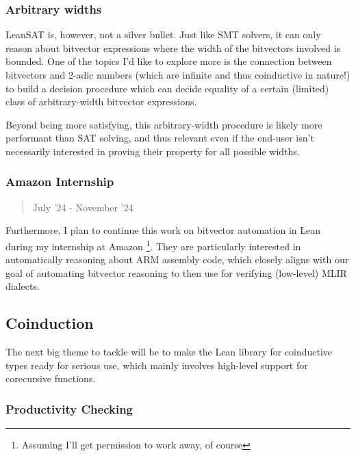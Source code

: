 \hypertarget{arbitrary-widths}{%
\subsubsection{Arbitrary widths}\label{arbitrary-widths}}

LeanSAT is, however, not a silver bullet. Just like SMT solvers, it can
only reason about bitvector expressions where the width of the
bitvectors involved is bounded. One of the topics I'd like to explore
more is the connection between bitvectors and 2-adic numbers (which are
infinite and thus coinductive in nature!) to build a decision procedure
which can decide equality of a certain (limited) class of
arbitrary-width bitvector expressions.

Beyond being more satisfying, this arbitrary-width procedure is likely
more performant than SAT solving, and thus relevant even if the end-user
isn't necessarily interested in proving their property for all possible
widths.

\hypertarget{amazon-internship}{%
\subsubsection{Amazon Internship}\label{amazon-internship}}

\begin{quote}
July '24 - November '24
\end{quote}

Furthermore, I plan to continue this work on bitvector automation in
Lean during my internship at Amazon \footnote{ Assuming I'll get
  permission to work away, of course}. They are particularly interested
in automatically reasoning about ARM assembly code, which closely aligns
with our goal of automating bitvector reasoning to then use for
verifying (low-level) MLIR dialects.

\hypertarget{coinduction}{%
\subsection{Coinduction}\label{coinduction}}

The next big theme to tackle will be to make the Lean library for
coinductive types ready for serious use, which mainly involves
high-level support for corecursive functions.

\hypertarget{productivity-checking}{%
\subsubsection{Productivity Checking}\label{productivity-checking}}

